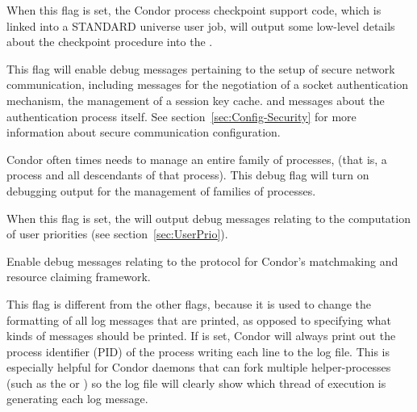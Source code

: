 \begin{description}
\begin{description}
  \label{dflag:ckpt}
  \item[\Dflag{CKPT}]
    When this flag is set,
    the Condor process checkpoint support code, which is linked into a STANDARD 
    universe user job, will output some low-level details about the checkpoint
    procedure into the .

  \label{dflag:security}
  \item[\Dflag{SECURITY}]
    This flag will enable debug messages pertaining to the setup of 
    secure network communication, 
    including messages for the negotiation of a socket 
    authentication mechanism, the management of a session key cache.
    and messages about the authentication process itself.  See
    section~\ref{sec:Config-Security} for more information about
    secure communication configuration.

  \label{dflag:procfamily}
  \item[\Dflag{PROCFAMILY}]
    Condor often times needs to manage an entire family of processes, (that
    is, a 
    process and all descendants of that process).  This debug flag will 
    turn on debugging output for the management of families of processes.

  \label{dflag:accountant}
  \item[\Dflag{ACCOUNTANT}]
    When this flag is set,
    the  will output debug messages relating to the computation
    of user priorities (see section~\ref{sec:UserPrio}).

  \label{dflag:protocol}
  \item[\Dflag{PROTOCOL}]
    Enable debug messages relating to the protocol for Condor's matchmaking and
    resource claiming framework.
    
  \label{dflag:pid}
  \item[\Dflag{PID}]
    This flag is different from the other flags, because it is
    used to change the formatting of all log messages that are printed,
    as opposed to specifying what kinds of messages should be printed.
    If  is set, Condor will always print out the process
    identifier (PID) of the process writing each line to the log file.
    This is especially helpful for Condor daemons that can fork
    multiple helper-processes (such as the  or
    ) so the log file will clearly show which thread
    of execution is generating each log message.
    

\end{description}
\end{description}
